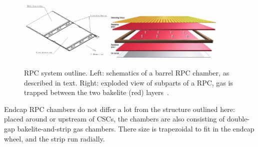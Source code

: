 \begin{figure}[htb]
  \begin{center}
    \includegraphics[width=0.4\textwidth]{Chapters/xLHCMS/rpcbarrel.png}
    \includegraphics[width=0.5\textwidth]{Chapters/xLHCMS/rpclayers.jpg}
    \caption{RPC system outline. Left: schematics of a barrel RPC
      chamber, as described in text. Right: exploded view of subparts
      of a RPC, gas is trapped between the two bakelite (red) layers~\cite{RPC}.}
    \label{fig:RPC}
  \end{center}
\end{figure}

Endcap RPC chambers do not differ a lot from the structure outlined
here: placed around or upstream of CSCs, the chambers are also
consisting of double-gap bakelite-and-strip gas chambers. There size
is trapezoidal to fit in the endcap wheel, and the strip run radially.


\vspace{0.5em}
\begin{center}
\end{center}


